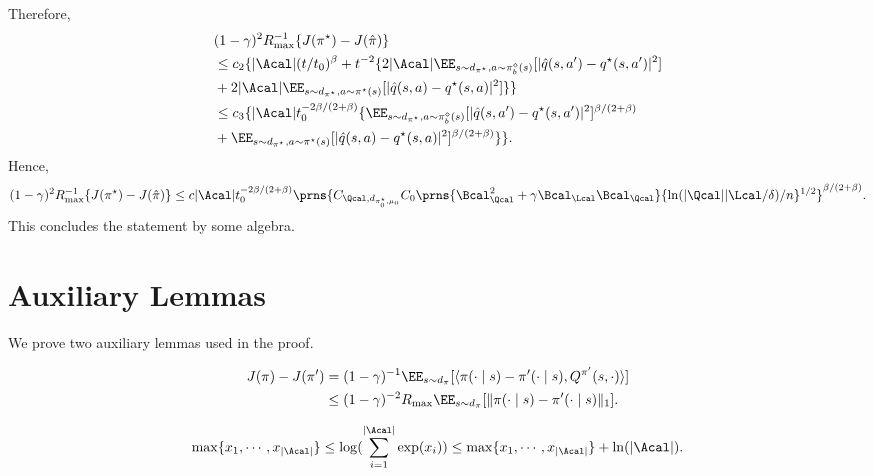 Therefore, 
\begin{align*}
&(1-\gamma)^2 R_{\max}^{-1}\{J(\pi^{\star})-J(\hat \pi)\}\\
&\leq c_2 \{ |\Acal|(t/t_0)^{\beta} +t^{-2}\{ 2 |\Acal| \EE_{s \sim d_{\pi^{\star}},a\sim \pi^{\diamond}_b(s)}[|\hat q(s,a')-q^{\star}(s,a')|^2]  \\
& +2|\Acal| \EE_{s \sim d_{\pi^{\star}},a\sim \pi^{\star}(s)}[|\hat q(s,a)-q^{\star}(s,a)|^2]\} \}  \\
&\leq c_3 \{ |\Acal| t^{-2\beta/(2+\beta)}_0\{\EE_{s \sim d_{\pi^{\star}},a\sim \pi^{\diamond}_b(s)}[|\hat q(s,a')-q^{\star}(s,a')|^2]^{\beta/(2+\beta)} \\ 
&+  \EE_{s \sim d_{\pi^{\star}},a\sim \pi^{\star}(s)}[|\hat q(s,a)-q^{\star}(s,a)|^2]^{\beta/(2+\beta)}  \} \}. 
\end{align*}
Hence, 
\begin{align*}
    (1-\gamma)^2R_{\max}^{-1}\{J(\pi^{\star})- J(\hat \pi)\}\leq c|\Acal|t^{-2\beta/(2+\beta)}_0\prns{C_{\Qcal,d_{\pi^{\star}_0,\mu_0} }C_0\prns{  \Bcal^2_{\Qcal}+ \gamma \Bcal_{\Lcal}\Bcal_{\Qcal}} 
    \{\ln(|\Qcal||\Lcal/\delta)/n\}^{1/2}    }^{\beta/(2+\beta)}. 
\end{align*}
This concludes the statement by some algebra. 
    

\section{Auxiliary Lemmas}

We prove two auxiliary lemmas used in the proof. 

\begin{lemma}\label{lem:performance}
\begin{align*}
    J(\pi)-J(\pi')&=(1-\gamma)^{-1}\EE_{s \sim d_{\pi}}[\langle \pi(\cdot \mid s)-\pi'(\cdot \mid s),Q^{\pi'}(s,\cdot)\rangle  ] \\
      &\leq (1-\gamma)^{-2}R_{\max} \EE_{s \sim d_{\pi}}[ \|\pi(\cdot \mid s)-\pi'(\cdot \mid s)\|_1 ]. 
\end{align*}    
\end{lemma}

\begin{lemma}\label{lem:useful_inequality}
    \begin{align*}
        \max\{x_1,\cdots,x_{|\Acal|}\} \leq \log(\sum_{i=1}^{|\Acal|} \exp(x_i))\leq  \max\{x_1,\cdots,x_{|\Acal|}\} + \ln(|\Acal|). 
    \end{align*}
\end{lemma}





